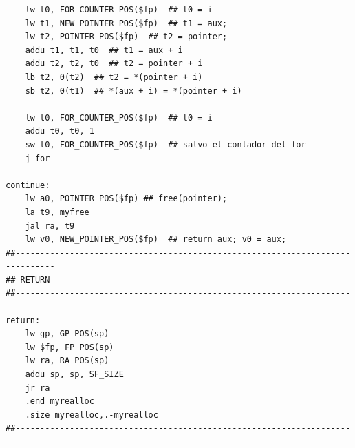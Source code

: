 \documentclass[a4paper,10pt]{article}
\begin{document}
\begin{lstlisting}
    lw t0, FOR_COUNTER_POS($fp)  ## t0 = i
    lw t1, NEW_POINTER_POS($fp)  ## t1 = aux;
    lw t2, POINTER_POS($fp)  ## t2 = pointer;
    addu t1, t1, t0  ## t1 = aux + i
    addu t2, t2, t0  ## t2 = pointer + i
    lb t2, 0(t2)  ## t2 = *(pointer + i)
    sb t2, 0(t1)  ## *(aux + i) = *(pointer + i)

    lw t0, FOR_COUNTER_POS($fp)  ## t0 = i
    addu t0, t0, 1
    sw t0, FOR_COUNTER_POS($fp)  ## salvo el contador del for
    j for

continue:
    lw a0, POINTER_POS($fp) ## free(pointer);
    la t9, myfree
    jal ra, t9
    lw v0, NEW_POINTER_POS($fp)  ## return aux; v0 = aux;
##------------------------------------------------------------------------------
## RETURN
##------------------------------------------------------------------------------
return:
    lw gp, GP_POS(sp)
    lw $fp, FP_POS(sp)
    lw ra, RA_POS(sp)
    addu sp, sp, SF_SIZE
    jr ra
    .end myrealloc
    .size myrealloc,.-myrealloc
##------------------------------------------------------------------------------
            
            \end{lstlisting}
            
            
\end{document}
